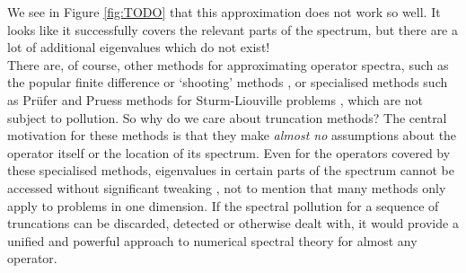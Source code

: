 \documentclass[../main.tex]{subfiles}
\begin{document}
\begin{example}
\end{example}

We see in Figure \ref{fig:TODO} that this approximation does not work so well. It looks like it successfully covers the relevant parts of the spectrum,
but there are a lot of additional eigenvalues which do not exist!\\

There are, of course, other methods for approximating operator spectra, such as the popular finite difference or `shooting' methods \cite{suli2003introduction}, or specialised methods such as Pr\"ufer and Pruess methods for Sturm-Liouville problems \cite{pryce1993numerical}, which are not subject to pollution. So why do we
care about truncation methods?
The central motivation for these methods is that they make \emph{almost no} assumptions about the operator itself or the location of its spectrum. Even for the operators covered by these specialised methods, eigenvalues in certain parts of the spectrum cannot be accessed without significant tweaking \cite{aceto2006numerical}, not to mention that many methods only apply to problems in one dimension.
If the spectral pollution for a sequence of truncations can be discarded, detected or otherwise dealt with, it would provide a unified and 
powerful approach to numerical spectral theory for almost any operator.
\end{document}
